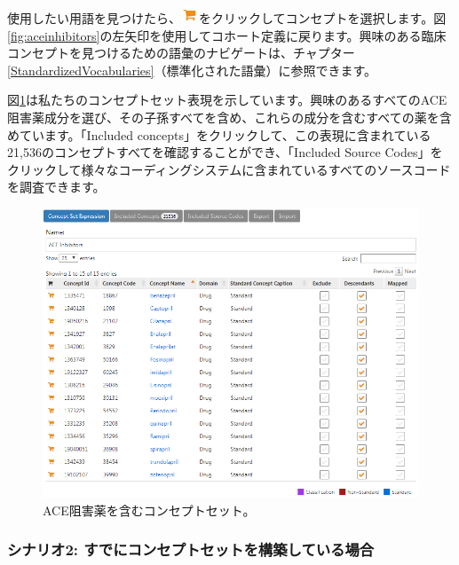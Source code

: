 \documentclass[
  11pt]{book}
\theoremstyle{definition}
\theoremstyle{definition}
\theoremstyle{definition}
\theoremstyle{definition}
\theoremstyle{remark}
\begin{document}
使用したい用語を見つけたら、\includegraphics{images/Cohorts/shoppingcart.png}をクリックしてコンセプトを選択します。図\ref{fig:aceinhibitors}の左矢印を使用してコホート定義に戻ります。興味のある臨床コンセプトを見つけるための語彙のナビゲートは、チャプター\ref{StandardizedVocabularies}（標準化された語彙）に参照できます。

図\ref{fig:aceConceptSetExpression}は私たちのコンセプトセット表現を示しています。興味のあるすべてのACE阻害薬成分を選び、その子孫すべてを含め、これらの成分を含むすべての薬を含めています。「Included concepts」をクリックして、この表現に含まれている21,536のコンセプトすべてを確認することができ、「Included Source Codes」をクリックして様々なコーディングシステムに含まれているすべてのソースコードを調査できます。

\begin{figure}

{\centering \includegraphics[width=1\linewidth]{images/Cohorts/aceConceptSetExpression} 

}

\caption{ACE阻害薬を含むコンセプトセット。}\label{fig:aceConceptSetExpression}
\end{figure}

\subsubsection*{シナリオ2: すでにコンセプトセットを構築している場合}\label{ux30b7ux30caux30eaux30aa2-ux3059ux3067ux306bux30b3ux30f3ux30bbux30d7ux30c8ux30bbux30c3ux30c8ux3092ux69cbux7bc9ux3057ux3066ux3044ux308bux5834ux5408}
\end{document}
